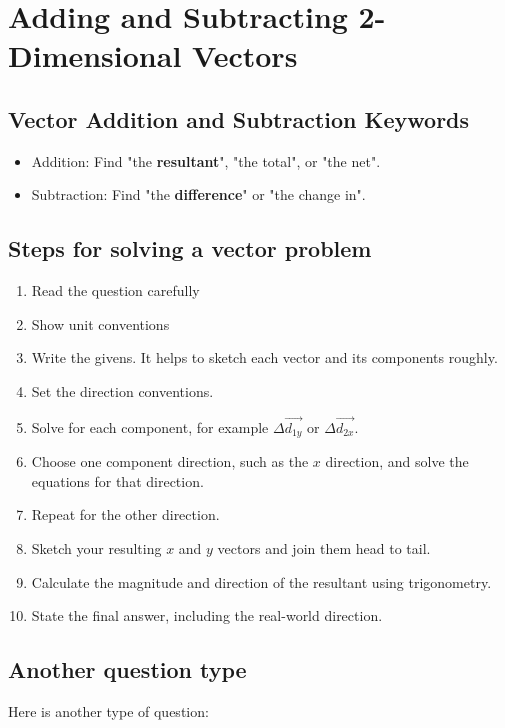 \section{Adding and Subtracting 2-Dimensional Vectors}
\subsection{Vector Addition and Subtraction Keywords}
\begin{itemize}
    \item[+] Addition: Find "the \textbf{resultant}", "the total", or "the net".
    \item[-] Subtraction: Find "the \textbf{difference}" or "the change in".
\end{itemize}

\subsection{Steps for solving a vector problem}
\begin{enumerate}
    \item Read the question carefully
    \item Show unit conventions
    \item Write the givens. It helps to sketch each vector and its components roughly.
    \item Set the direction conventions.
    \item Solve for each component, for example $\Delta\vec{d_{1y}}$ or $\Delta\vec{d_{2x}}$.
    \item Choose one component direction, such as the $x$ direction, and solve the equations for that direction.
    \item Repeat for the other direction.
    \item Sketch your resulting $x$ and $y$ vectors and join them head to tail.
    \item Calculate the magnitude and direction of the resultant using trigonometry.
    \item State the final answer, including the real-world direction.
\end{enumerate}


\subsection{Another question type}
Here is another type of question:
